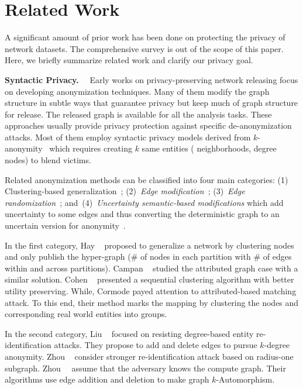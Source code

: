 \section{Related Work}
\label{sec:relatedWork}
A significant amount of prior work has been done on protecting the privacy of network datasets.
The comprehensive survey is out of the scope of this paper. 
Here, we briefly summarize related work and clarify our privacy goal. 

\textbf{Syntactic Privacy.}~~
Early works on privacy-preserving network releasing focus on developing anonymization techniques.
Many of them modify the graph structure in subtle ways that guarantee privacy but keep much of graph structure for release. 
The released graph is available for all the analysis tasks. 
These approaches usually provide privacy protection against specific de-anonymization attacks. 
Most of them employ syntactic privacy models derived from $k$-anonymity~\cite{Sweeney:2002:KAM:774544.774552} which requires creating $k$ same entities ({\eg} neighborhoods, degree nodes) to blend victims. 

Related anonymization methods can be classified into four main categories: (1) Clustering-based generalization~\cite{Hay_Anonymizing_2007,Bhagat_Class_2009,hay2010resisting}; (2)~{\em Edge modification}~\cite{Liu_Towards_2008, Zhou_Preserving_2008, Zou:2009, Wang2011, Wu_k_2010, Skarkala_Privacy_2012}; 
(3)~{\em Edge randomization}~\cite{Liu_Privacy_2009,Ying_Randomizing_2008, Ninggal_Utility_2015};
and~(4)~{\em Uncertainty semantic-based modifications} which add uncertainty to some edges and thus converting the deterministic graph to an uncertain version for anonymity~\cite{Boldi_Injecting_2012, Nguyen_Anonymizing_2015}. 

In the first category, Hay {\etal}~\cite{Hay_Anonymizing_2007} proposed to generalize a network by clustering nodes and only publish the hyper-graph ($\#$ of nodes in each partition with $\#$ of edges within and across partitions). Campan {\etal}~\cite{Campan2008} studied the attributed graph case with a similar solution. 
Cohen {\etal}~\cite{Cohen2013} presented a sequential clustering algorithm with better utility preserving. While, Cormode{\etal} \cite{Bhagat_Class_2009} payed attention to attributed-based matching attack. To this end, their method marks the mapping by clustering the nodes and corresponding real world entities into groups. 

In the second category, Liu {\etal}~\cite{Liu_Towards_2008} focused on resisting degree-based entity re-identification attacks. They propose to add and delete edges to pursue $k$-degree anonymity. Zhou {\etal}~\cite{Zhou_Preserving_2008} consider stronger re-identification attack based on radius-one subgraph. Zhou~{\etal}~\cite{Zou:2009} assume that the adversary knows the compute graph. Their algorithms use edge addition and deletion to make graph $k$-Automorphism.  

